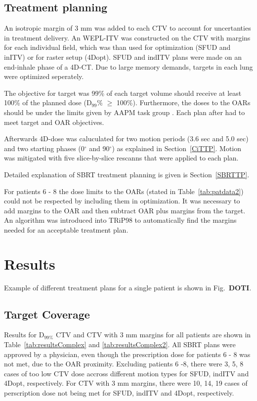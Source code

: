 \documentclass[type=dr, dr=rernat, accentcolor=tud7b,colorbacktitle, bigchapter, openright, twoside, 12pt ]{tudthesis}
\begin{document}
\subsection{Treatment planning}

An isotropic margin of 3 mm was added to each CTV to account for uncertanties in treatment delivery. An WEPL-ITV was constructed on the CTV with margins for each individual field, which was than used for optimization (SFUD
and inITV) or for raster setup (4Dopt). SFUD and indITV plans were made on an end-inhale phase of a 4D-CT. Due to large memory demands, targets in each lung were optimized seperately. 
  
The objective for target was 99\% of each target volume should receive at least 100\% of the planned dose (D$_{99}$\% $\geq$ 100\%). Furthermore, the doses to the OARs should be under the limits given by AAPM task group \cite{Benedict2010}. 
Each plan after had to meet target and OAR objectives. 

Afterwards 4D-dose was caluculated for two motion periods (3.6 sec and 5.0 sec) and two starting phases (0$^\circ$ and 90$^\circ$) as explained in Section~\ref{CiTTP}. Motion was mitigated with five 
slice-by-slice rescanns that were applied to each plan.

Detailed explanation of SBRT treatment planning is given is Section~\ref{SBRTTP}.

For patients 6 - 8 the dose limits to the OARs (stated in Table~\ref{tab:patdata2}) could not be respected by including them in optimization. It was necessary to add margins to the OAR and then 
subtract OAR plus margins from the target. An algorithm was introduced into TRiP98 to automatically find the margins needed for an acceptable treatment plan.

\section{Results}

Example of different treatment plans for a single patient is shown in Fig.~\textbf{DOTI}.

\subsection{Target Coverage}

Results for D$_{99\%}$ CTV and CTV with 3 mm margins for all patients are shown in Table~\ref{tab:resultsComplex} and \ref{tab:resultsComplex2}. All SBRT plans were approved by a physician, 
even though the prescription dose for patients 6 - 8 was not met, due to the OAR proximity. Excluding patients 6 -8, there were 3, 5, 8  cases of too low CTV dose accross different
motion types for SFUD, indITV and 4Dopt, respectively. For CTV with 3 mm margins, there were 10, 14, 19 cases of perscription dose not being met for SFUD, indITV and 4Dopt, respectively.
\end{document}
